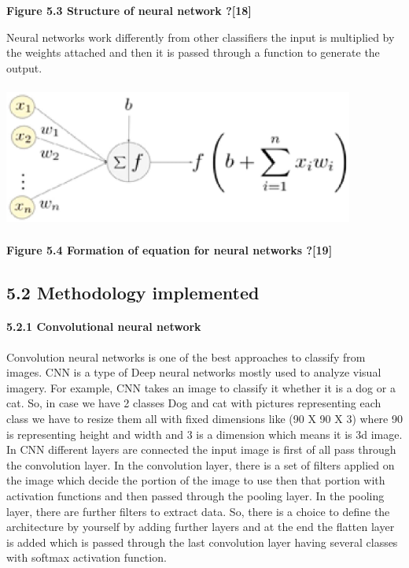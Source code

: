 \documentclass{article} %
\begin{document}
\noindent \textbf{Figure 5.3 Structure of neural network ?[18]}

\noindent Neural networks work differently from other classifiers the input is multiplied by the weights attached and then it is passed through a function to generate the output.

\noindent \includegraphics*[width=4.54in, height=1.86in, keepaspectratio=false]{image23}

\noindent \textbf{Figure 5.4 Formation of equation for neural networks ?[19]}

\noindent 
\subsection{5.2 Methodology implemented}

\noindent 
\paragraph{5.2.1 Convolutional neural network}

\noindent Convolution neural networks is one of the best approaches to classify from images. CNN is a type of Deep neural networks mostly used to analyze visual imagery. For example, CNN takes an image to classify it whether it is a dog or a cat. So, in case we have 2 classes Dog and cat with pictures representing each class we have to resize them all with fixed dimensions like (90 X 90 X 3) where 90 is representing height and width and 3 is a dimension which means it is 3d image. In CNN different layers are connected the input image is first of all pass through the convolution layer. In the convolution layer, there is a set of filters applied on the image which decide the portion of the image to use then that portion with activation functions and then passed through the pooling layer. In the pooling layer, there are further filters to extract data. So, there is a choice to define the architecture by yourself by adding further layers and at the end the flatten layer is added which is passed through the last convolution layer having several classes with softmax activation function.
\end{document}
